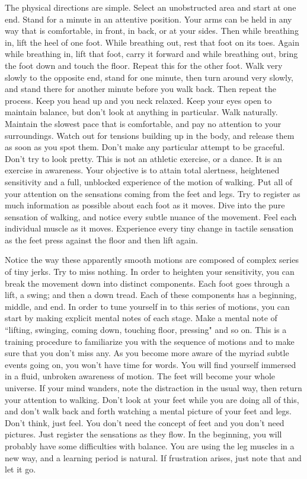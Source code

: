 The physical directions are simple. Select an unobstructed area and start at one
end. Stand for a minute in an attentive position.  Your arms can be held in any
way that is comfortable, in front, in back, or at your sides. Then while
breathing in, lift the heel of one foot. While breathing out, rest that foot on
its toes. Again while breathing in, lift that foot, carry it forward and while
breathing out, bring the foot down and touch the floor.  Repeat this for the
other foot. Walk very slowly to the opposite end, stand for one minute, then
turn around very slowly, and stand there for another minute before you walk
back. Then repeat the process.  Keep you head up and you neck relaxed. Keep your
eyes open to maintain balance, but don't look at anything in particular. Walk
naturally. Maintain the slowest pace that is comfortable, and pay no attention
to your surroundings. Watch out for tensions building up in the body, and
release them as soon as you spot them.  Don't make any particular attempt to be
graceful. Don't try to look pretty. This is not an athletic exercise, or a
dance. It is an exercise in awareness. Your objective is to attain total
alertness, heightened sensitivity and a full, unblocked experience of the motion
of walking. Put all of your attention on the sensations coming from the feet and
legs. Try to register as much information as possible about each foot as it
moves. Dive into the pure sensation of walking, and notice every subtle nuance
of the movement. Feel each individual muscle as it moves. Experience every tiny
change in tactile sensation as the feet press against the floor and then lift
again.

Notice the way these apparently smooth motions are composed of complex series of
tiny jerks. Try to miss nothing. In order to heighten your sensitivity, you can
break the movement down into distinct components. Each foot goes through a lift,
a swing; and then a down tread. Each of these components has a beginning,
middle, and end. In order to tune yourself in to this series of motions, you can
start by making explicit mental notes of each stage.  Make a mental note of
``lifting, swinging, coming down, touching floor, pressing" and so on. This is a
training procedure to familiarize you with the sequence of motions and to make
sure that you don't miss any. As you become more aware of the myriad subtle
events going on, you won't have time for words. You will find yourself immersed
in a fluid, unbroken awareness of motion.  The feet will become your whole
universe. If your mind wanders, note the distraction in the usual way, then
return your attention to walking. Don't look at your feet while you are doing
all of this, and don't walk back and forth watching a mental picture of your
feet and legs. Don't think, just feel. You don't need the concept of feet and
you don't need pictures. Just register the sensations as they flow. In the
beginning, you will probably have some difficulties with balance. You are using
the leg muscles in a new way, and a learning period is natural. If frustration
arises, just note that and let it go.

